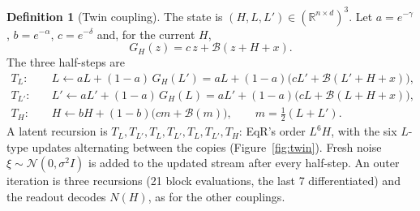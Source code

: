 \documentclass[11pt]{article}
\theoremstyle{definition}
\newtheorem{definition}{Definition}
\newcommand{\R}{\mathbb{R}}
\newcommand{\Bk}{\mathcal{B}}
\begin{document}
\begin{definition}[Twin coupling]\label{def:twin}
The state is $(H,L,L')\in(\R^{n\times d})^3$. Let $a=e^{-\gamma}$, $b=e^{-\alpha}$, $c=e^{-\delta}$ and, for the current $H$,
\[
G_H(z)=c\,z+\Bk(z+H+x).
\]
The three half-steps are
\begin{align*}
T_L:&\quad L\leftarrow aL+(1-a)\,G_H(L') = aL+(1-a)\bigl(cL'+\Bk(L'+H+x)\bigr),\\
T_{L'}:&\quad L'\leftarrow aL'+(1-a)\,G_H(L) = aL'+(1-a)\bigl(cL+\Bk(L+H+x)\bigr),\\
T_H:&\quad H\leftarrow bH+(1-b)\bigl(cm+\Bk(m)\bigr),\qquad m=\tfrac12(L+L').
\end{align*}
A latent recursion is $T_L,T_{L'},T_L,T_{L'},T_L,T_{L'},T_H$: EqR's order $L^6H$, with the six $L$-type updates alternating between the
copies (Figure~\ref{fig:twin}). Fresh noise $\xi\sim\mathcal N(0,\sigma^2I)$ is added to the updated stream after every half-step. An outer
iteration is three recursions (21 block evaluations, the last 7 differentiated) and the readout decodes $N(H)$, as for the other couplings.
\end{definition}
\end{document}
